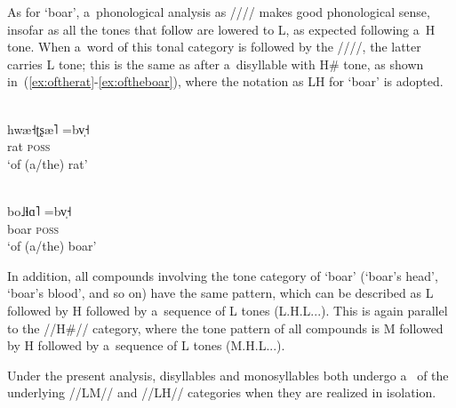 {{{{As for ‘boar’, a~phonological analysis as //// makes good phonological sense, insofar as
all the tones that follow are lowered to L, as expected following a~H tone. When a~word of this
tonal category is followed by the  ////, the latter carries L tone; this is the same as
after a~disyllable with H\# tone, as shown in~(\ref{ex:oftherat}-\ref{ex:oftheboar}), where the notation as LH for ‘boar’ is adopted.
\begin{exe}
  \ex \label{boarrat}
  \begin{xlist}
    \ex 
    \label{ex:oftherat}
    \\
    \gll hwæ˧ʈʂæ˥	=bv̩˧\\
	rat	\textsc{poss}\\
    \glt ‘of \mbox{(a/the)} rat’

    \ex 
    \label{ex:oftheboar}
    \\
    \gll bo˩ɬɑ˥	=bv̩˧\\
    boar	\textsc{poss}\\
    \glt ‘of \mbox{(a/the)} boar’
  \end{xlist}
\end{exe}

In addition, all compounds involving the tone category of ‘boar’ (‘boar’s head’, ‘boar’s blood’, and so on) have the same pattern, which can be described as L followed by H followed by a~sequence of L tones (L.H.L...). This
is again parallel to the \mbox{//H\#//} category, where the tone pattern of all compounds is M followed by H followed by a~sequence of
L tones (M.H.L...).

Under the present analysis, disyllables and monosyllables both undergo a~ of the
underlying \mbox{//LM//} and \mbox{//LH//} categories when they are realized in isolation. 

}}}}
